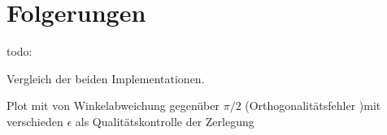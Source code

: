 %
%
%
\section{Folgerungen
\label{qr:section:folgerungen}}
todo:

Vergleich der beiden Implementationen.

Plot mit von Winkelabweichung gegenüber $\pi/2$ (\glqq Orthogonalitätsfehler \grqq{})mit verschieden $\epsilon$ als Qualitätskontrolle der Zerlegung

